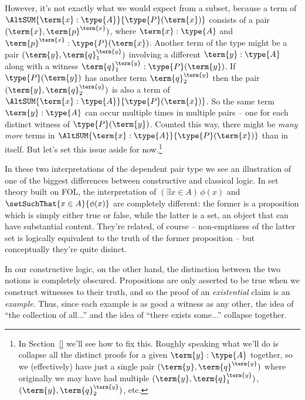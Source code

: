 However, it's not exactly what we would expect from a subset, because a term of
$\AltSUM{\term{x}:\type{A}}{\type{P}(\term{x})}$
consists of a pair 
$(\term{x}, \term{p}^{\term{x}})$, where 
$\term{x}:\type{A}$ and $\term{p}^{\term{x}}:\type{P}(\term{x})$.  
Another term of the type might be a pair
$(\term{y}, \term{q}^{\term{y}}_1)$ involving a
different 
$\term{y}:\type{A}$ 
along with a witness 
$\term{q}^{\term{y}}_1:\type{P}(\term{y})$.  
If $\type{P}(\term{y})$ has another term $\term{q}^{\term{y}}_2$ then 
the pair
$(\term{y}, \term{q}^{\term{y}}_2)$ is also a term of 
$\AltSUM{\term{x}:\type{A}}{\type{P}(\term{x})}$.
So the same term $\term{y}:\type{A}$ can occur multiple times in multiple pairs -- one for each distinct witness of $\type{P}(\term{y})$.  Counted this way, there might be \emph{many more} terms in $\AltSUM{\term{x}:\type{A}}{\type{P}(\term{x})}$
 than in  itself.  But let's set this issue aside for now.\footnote{
In  Section~\ref{} we'll see how to fix this.  Roughly speaking what we'll do is collapse all the distinct proofs for a given 
$\term{y}:\type{A}$ 
together, so we (effectively) have just a single pair $(\term{y}, \term{q}^{\term{y}})$ where originally we may have had multiple $(\term{y}, \term{q}^{\term{y}}_1)$, $(\term{y}, \term{q}^{\term{y}}_2)$, etc.
}

In these two interpretations of the dependent pair type we see an illustration of one of the biggest differences between constructive and classical logic.  In set theory built on FOL, the interpretation of $(\exists x \in A)\, \phi(x)$ and $\setSuchThat{x \in A}{\phi(x)}$ are completely different: the former is a proposition which is simply either true or false, while the latter is a set, an object that can have substantial content.  They're related, of course -- non-emptiness of the latter set is logically equivalent to the truth of the former proposition -- but conceptually they're quite disinct.

In our constructive logic, on the other hand, the distinction between the two notions is completely obscured.  Propositions are only asserted to be true when we construct witnesses to their truth, and so the proof of an \emph{existential} claim is an \emph{example}.  
Thus, since each example is as good a witness as any other, the idea of ``the collection of all...'' 
and the idea of 
``there exists some...'' 
collapse together.



\newpage




